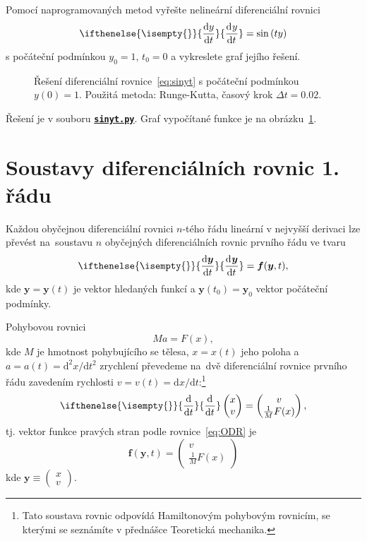 \documentclass[a4paper,11pt,twoside]{article}
\def\vector#1{\boldsymbol{#1}}								%
\renewcommand{\d}{\mathrm{d}}
\newcommand{\derivative}[3][]{\ifthenelse{\isempty{#1}}	    %
	{\frac{\d{#2}}{\d{#3}}}
	{\frac{\d^{#1}{#2}}{\d{#3}^{#1}}}
}
\def\makematrix#1{\begin{pmatrix}#1\end{pmatrix}}       %
\def\ghfile#1#2{\textnormal{\textbf{\texttt{\href{https://github.com/PavelStransky/PCInPhysics/blob/main/#1#2}{#2}}}}}
\theoremstyle{red}
\theoremstyle{green}
\begin{document}
\begin{task}
    Pomocí naprogramovaných metod vyřešte nelineární diferenciální rovnici
    \begin{equation}
        \label{eq:sinyt}
        \derivative{y}{t}=\sin\left(t y\right)
    \end{equation}
    s počáteční podmínkou $y_{0}=1$, $t_{0}=0$ a vykreslete graf jejího řešení.
\end{task}

\begin{solution}
    \begin{figure}[!htb]
        \centering{}
        \caption{
            \protect\small
            Řešení diferenciální rovnice~\eqref{eq:sinyt} s počáteční podmínkou $y(0)=1$.
            Použitá metoda: Runge-Kutta, časový krok $\Delta t=0.02$.
        }
        \label{fig:sinyt}
    \end{figure}

    Řešení je v souboru \ghfile{python/ode/}{sinyt.py}.
    Graf vypočítané funkce je na obrázku~\ref{fig:sinyt}.
\end{solution}


\section{Soustavy diferenciálních rovnic 1. řádu}
\label{sec:ODRn}
    Každou obyčejnou diferenciální rovnici $n$-tého řádu lineární v nejvyšší derivaci lze převést na~soustavu $n$ obyčejných diferenciálních rovnic prvního řádu ve tvaru
    \begin{equation}\label{eq:ODR}
        \derivative{\vector{y}}{t}=\vector{f}(\vector{y},t),
    \end{equation}
    kde $\vector{y}=\vector{y}(t)$ je vektor hledaných funkcí a $\vector{y}(t_{0})=\vector{y}_{0}$ vektor počáteční podmínky.

    \begin{example}
        Pohybovou rovnici
        \begin{equation}
            Ma=F(x),
        \end{equation}
        kde $M$ je hmotnost pohybujícího se tělesa, $x=x(t)$ jeho poloha a $a=a(t)=\d^{2}x/\d t^{2}$ zrychlení převedeme na~dvě diferenciální rovnice prvního řádu zavedením rychlosti $v=v(t)=\d x/\d t$:\footnote{
            Tato soustava rovnic odpovídá Hamiltonovým pohybovým rovnicím, se kterými se seznámíte v přednášce Teoretická mechanika.
        }
        \begin{equation}
            \derivative{}{t}\makematrix{x \\ v}=\makematrix{v \\ \frac{1}{M}F(x)},
        \end{equation}
        tj. vektor funkce pravých stran podle rovnice~\eqref{eq:ODR} je
        \begin{equation}
            \vector{f}(\vector{y},t)=\makematrix{v \\ \frac{1}{M}F(x)}
        \end{equation}
        kde $\vector{y}\equiv\makematrix{x \\ v}$.
    \end{example}
\end{document}
